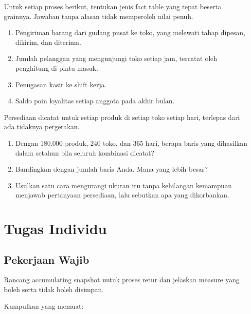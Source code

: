 
Untuk setiap proses berikut, tentukan jenis fact table yang tepat beserta
grainnya. Jawaban tanpa alasan tidak memperoleh nilai penuh.

\begin{enumerate}[leftmargin=1.4em]
  \item Pengiriman barang dari gudang pusat ke toko, yang melewati tahap
        dipesan, dikirim, dan diterima.
  \item Jumlah pelanggan yang mengunjungi toko setiap jam, tercatat oleh
        penghitung di pintu masuk.
  \item Penugasan kasir ke shift kerja.
  \item Saldo poin loyalitas setiap anggota pada akhir bulan.
\end{enumerate}


Persediaan dicatat untuk setiap produk di setiap toko setiap hari, terlepas
dari ada tidaknya pergerakan.

\begin{enumerate}[leftmargin=1.4em]
  \item Dengan 180.000 produk, 240 toko, dan 365 hari, berapa baris yang
        dihasilkan dalam setahun bila seluruh kombinasi dicatat?
  \item Bandingkan dengan jumlah baris  Anda. Mana
        yang lebih besar?
  \item Usulkan satu cara mengurangi ukuran itu tanpa kehilangan kemampuan
        menjawab pertanyaan persediaan, lalu sebutkan apa yang dikorbankan.
\end{enumerate}

\section{Tugas Individu}

\subsection{Pekerjaan Wajib}
Rancang accumulating snapshot untuk proses retur dan jelaskan measure yang
boleh serta tidak boleh disimpan.

Kumpulkan  yang memuat:

